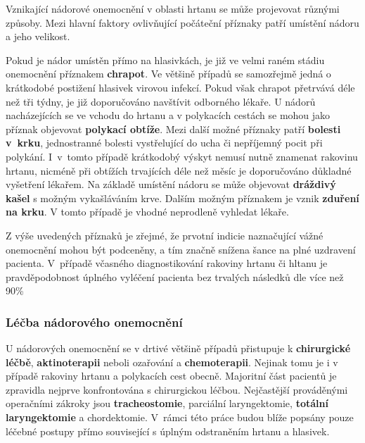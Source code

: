 Vznikající nádorové onemocnění v oblasti hrtanu se může projevovat různými
způsoby. Mezi hlavní faktory ovlivňující počáteční příznaky patří umístění nádoru a
jeho velikost.

Pokud je nádor umístěn přímo na hlasivkách, je již ve velmi raném stádiu onemocnění příznakem \textbf{chrapot}.
Ve většině případů se samozřejmě jedná o krátkodobé postižení hlasivek virovou infekcí. Pokud však chrapot přetrvává déle než tři týdny, je již doporučováno navštívit odborného lékaře.
U nádorů nacházejících se ve vchodu do hrtanu a v polykacích cestách se mohou
jako příznak objevovat \textbf{polykací obtíže}. Mezi další možné příznaky
patří \textbf{bolesti v~krku}, jednostranné bolesti vystřelující do ucha či
nepříjemný pocit při polykání. I~v~tomto případě krátkodobý výskyt nemusí
nutně znamenat rakovinu hrtanu, nicméně při obtížích trvajících déle než měsíc
je doporučováno důkladné  vyšetření lékařem.
Na základě umístění nádoru se může objevovat \textbf{dráždivý kašel} s možným
vykašláváním krve. Dalším možným příznakem je vznik \textbf{zduření na krku}.
V tomto případě je vhodné neprodleně vyhledat lékaře.

Z výše uvedených příznaků je zřejmé, že prvotní indicie naznačující vážné onemocnění
mohou být podceněny, a tím značně snížena šance na plné uzdravení pacienta.
V~případě včasného diagnostikování rakoviny hrtanu či hltanu je pravděpodobnost
úplného vyléčení pacienta bez trvalých následků dle \cite{Slavicek2000} více než 90\%



\subsubsection{Léčba nádorového onemocnění} %
\label{chap:cause:desease:cancer:treatment}

U nádorových onemocnění se v drtivé většině případů přistupuje k
\textbf{chirurgické léčbě}, \textbf{aktinoterapii} neboli ozařování a
\textbf{chemoterapii}. Nejinak tomu je i v případě rakoviny hrtanu a
polykacích cest obecně. Majoritní část pacientů je zpravidla nejprve
konfrontována s chirurgickou léčbou. Nejčastější prováděnými operačními zákroky jsou
\textbf{tracheostomie}, parciální laryngektomie, \textbf{totální
laryngektomie} a chordektomie. V~rámci této práce budou blíže popsány pouze
léčebné postupy přímo související s úplným odstraněním hrtanu a hlasivek.

